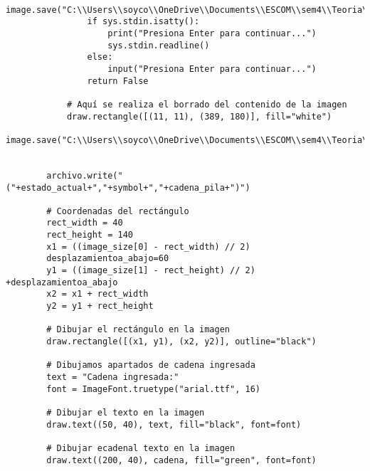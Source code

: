 \begin{enumerate}
\begin{lstlisting}
                image.save("C:\\Users\\soyco\\OneDrive\\Documents\\ESCOM\\sem4\\Teoria\\P2\\Prog4\\output\\animacion.png")
                if sys.stdin.isatty():
                    print("Presiona Enter para continuar...")
                    sys.stdin.readline()
                else:
                    input("Presiona Enter para continuar...")
                return False
            
            # Aquí se realiza el borrado del contenido de la imagen
            draw.rectangle([(11, 11), (389, 180)], fill="white")
            image.save("C:\\Users\\soyco\\OneDrive\\Documents\\ESCOM\\sem4\\Teoria\\P2\\Prog4\\output\\animacion.png")

            
        archivo.write("("+estado_actual+","+symbol+","+cadena_pila+")")    
        
        # Coordenadas del rectángulo
        rect_width = 40
        rect_height = 140
        x1 = ((image_size[0] - rect_width) // 2)
        desplazamientoa_abajo=60
        y1 = ((image_size[1] - rect_height) // 2) +desplazamientoa_abajo
        x2 = x1 + rect_width
        y2 = y1 + rect_height
        
        # Dibujar el rectángulo en la imagen
        draw.rectangle([(x1, y1), (x2, y2)], outline="black")
        
        # Dibujamos apartados de cadena ingresada
        text = "Cadena ingresada:"
        font = ImageFont.truetype("arial.ttf", 16)

        # Dibujar el texto en la imagen
        draw.text((50, 40), text, fill="black", font=font)
        
        # Dibujar ecadenal texto en la imagen 
        draw.text((200, 40), cadena, fill="green", font=font) 
        

\end{lstlisting}
\end{enumerate}

